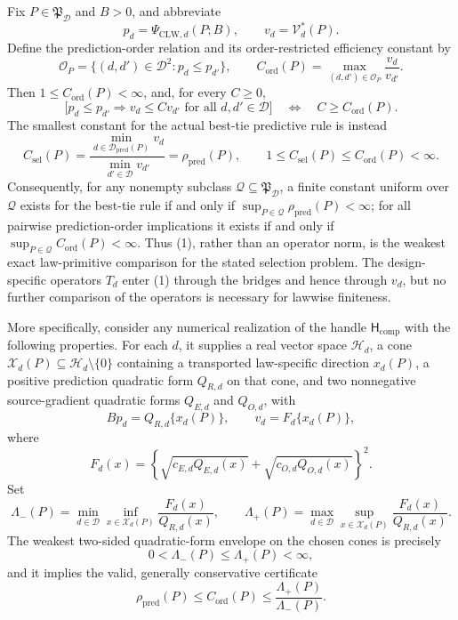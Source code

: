 Fix \(P\in\mathfrak P_{\mathcal D}\) and \(B>0\), and abbreviate
\[
 p_d=\Psi_{\mathrm{CLW},d}(P;B),
 \qquad
 v_d=\mathcal V_d^*(P).
\]
Define the prediction-order relation and its order-restricted efficiency constant by
\[
 \mathcal O_P
 =\{(d,d')\in\mathcal D^2:p_d\le p_{d'}\},
 \qquad
 C_{\mathrm{ord}}(P)
 =\max_{(d,d')\in\mathcal O_P}\frac{v_d}{v_{d'}}.
 \tag{1}
\]
Then \(1\le C_{\mathrm{ord}}(P)<\infty\), and, for every \(C\ge0\),
\[
 \bigl[p_d\le p_{d'}\Longrightarrow v_d\le C v_{d'}
 \text{ for all }d,d'\in\mathcal D\bigr]
 \quad\Longleftrightarrow\quad
 C\ge C_{\mathrm{ord}}(P).
 \tag{2}
\]
The smallest constant for the actual best-tie predictive rule is instead
\[
 C_{\mathrm{sel}}(P)
 =\frac{\min_{d\in\mathcal D_{\mathrm{pred}}(P)}v_d}
 {\min_{d'\in\mathcal D}v_{d'}}
 =\rho_{\mathrm{pred}}(P),
 \qquad
 1\le C_{\mathrm{sel}}(P)\le C_{\mathrm{ord}}(P)<\infty.
 \tag{3}
\]
Consequently, for any nonempty subclass \(\mathcal Q\subseteq\mathfrak P_{\mathcal D}\), a finite constant uniform over \(\mathcal Q\) exists for the best-tie rule if and only if
\(\sup_{P\in\mathcal Q}\rho_{\mathrm{pred}}(P)<\infty\); for all pairwise prediction-order implications it exists if and only if
\(\sup_{P\in\mathcal Q}C_{\mathrm{ord}}(P)<\infty\).  Thus (1), rather than an operator norm, is the weakest exact law-primitive comparison for the stated selection problem.  The design-specific operators \(T_d\) enter (1) through the bridges and hence through \(v_d\), but no further comparison of the operators is necessary for lawwise finiteness.

More specifically, consider any numerical realization of the handle \(\mathsf H_{\mathrm{comp}}\) with the following properties.  For each \(d\), it supplies a real vector space \(\mathcal H_d\), a cone \(\mathcal X_d(P)\subseteq\mathcal H_d\setminus\{0\}\) containing a transported law-specific direction \(x_d(P)\), a positive prediction quadratic form \(Q_{R,d}\) on that cone, and two nonnegative source-gradient quadratic forms \(Q_{E,d}\) and \(Q_{O,d}\), with
\[
 Bp_d=Q_{R,d}\{x_d(P)\},
 \qquad
 v_d=F_d\{x_d(P)\},
 \tag{4}
\]
where
\[
 F_d(x)
 =\left\{
 \sqrt{c_{E,d}Q_{E,d}(x)}
 +\sqrt{c_{O,d}Q_{O,d}(x)}
 \right\}^2.
 \tag{5}
\]
Set
\[
 \Lambda_-(P)
 =\min_{d\in\mathcal D}\inf_{x\in\mathcal X_d(P)}
 \frac{F_d(x)}{Q_{R,d}(x)},
 \qquad
 \Lambda_+(P)
 =\max_{d\in\mathcal D}\sup_{x\in\mathcal X_d(P)}
 \frac{F_d(x)}{Q_{R,d}(x)}.
 \tag{6}
\]
The weakest two-sided quadratic-form envelope on the chosen cones is precisely
\[
 0<\Lambda_-(P)\le\Lambda_+(P)<\infty,
 \tag{7}
\]
and it implies the valid, generally conservative certificate
\[
 \rho_{\mathrm{pred}}(P)
 \le C_{\mathrm{ord}}(P)
 \le\frac{\Lambda_+(P)}{\Lambda_-(P)}.
 \tag{8}
\]

